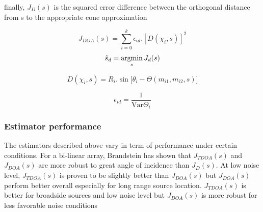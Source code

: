 finally, $J_{D}(s)$ is the squared error difference between the orthogonal distance from s to the appropriate cone approximation 

\begin{equation}
J_{DOA}(s) = {\sum}_{i=0}^k \epsilon_{id}.[D(\chi_{i},s)]^2
\label{eq:jd}
\end{equation}
\begin{equation}
\hat{s}_{d}= \argmin_{s} J_{d}(s) 
\end{equation}


\begin{equation}
D(\chi_{i},s)=R_{i}.\sin{[\theta_{i}-\Theta(m_{i1},m_{i2},s)}]  
\end{equation}

\begin{equation}
 \epsilon_{id}=\frac{1}{\mathrm{Var}{\Theta_{i}}}    
\end{equation}

\subsubsection{Estimator performance}

The estimators described above vary in term of performance under certain conditions. For a bi-linear array, Brandstein has shown that $J_{TDOA}(s)$ and $J_{DOA}(s)$ are more robust to great angle of incidence than $J_{D}(s)$. At low noise level, $J_{TDOA}(s)$ is proven to be slightly better than $J_{DOA}(s)$ but $J_{DOA}(s)$ perform better overall especially for long range source location. $J_{TDOA}(s)$ is better for broadside sources and low noise level but $J_{DOA}(s)$ is more robust for less favorable noise conditions

